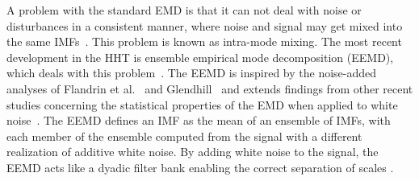 \documentclass[11pt,draftcls,onecolumn]{IEEEtran}
\begin{document}
A problem with the standard EMD is that it can not deal with noise or disturbances in a consistent manner, where noise and signal may get mixed into the same IMFs~\cite{Wu2009}. This problem is known as intra-mode mixing. The most recent development in the HHT is ensemble empirical mode decomposition (EEMD), which deals with this problem~\cite{Wu2009}. The EEMD is inspired by the noise-added analyses of Flandrin et al.~\cite{Flandrin2005} and Glendhill~\cite{Gledhill2003} and extends findings from other recent studies concerning the statistical properties of the EMD when applied to white noise~\cite{Flandrin2004,Wu2004}. The EEMD defines an IMF as the mean of an ensemble of IMFs, with each member of the ensemble computed from the signal with a different realization of additive white noise. By adding white noise to the signal, the EEMD acts like a dyadic filter bank enabling the correct separation of scales \cite{Flandrin2005a}.
\end{document}
